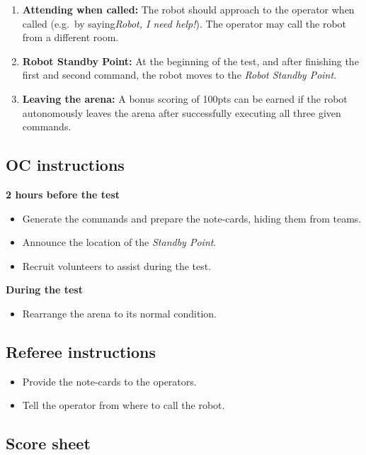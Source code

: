\begin{enumerate}[nosep]
	\item \textbf{Attending when called:} The robot should approach to the operator when called (e.g.~by saying\textit {Robot, I need help!}). The operator may call the robot from a different room.

	\item \textbf{Robot Standby Point:} At the beginning of the test, and after finishing the first and second command, the robot moves to the \textit{Robot Standby Point}.

	\item \textbf{Leaving the arena:} A bonus scoring of 100pts can be earned if the robot autonomously leaves the arena after successfully executing all three given commands.
\end{enumerate}

\subsection*{OC instructions}

\textbf{2 hours before the test}
\begin{itemize}
	\item Generate the commands and prepare the note-cards, hiding them from teams.
	\item Announce the location of the \emph{Standby Point}.
	\item Recruit volunteers to assist during the test.
\end{itemize}

\textbf{During the test}
\begin{itemize}[nosep]
	\item Rearrange the arena to its normal condition.
\end{itemize}

\subsection*{Referee instructions}
\begin{itemize}
	\item Provide the note-cards to the operators.
	\item Tell the operator from where to call the robot.
\end{itemize}

\subsection*{Score sheet}


